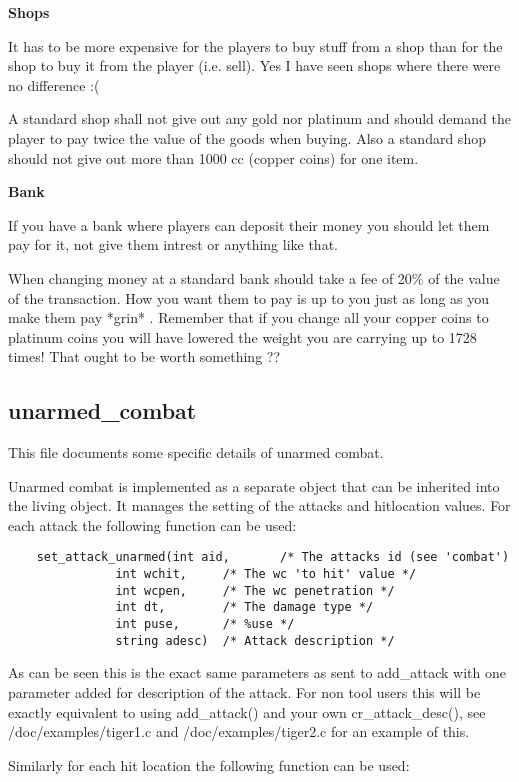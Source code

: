 {\bf Shops}

It has to be more expensive for the players to buy stuff from a
shop than for the shop to buy it from the player (i.e. sell). Yes
I have seen shops where there were no difference :( 

A standard shop shall not give out any gold nor platinum and
should demand the player to pay twice the value of the goods
when buying. Also a standard shop should not give out more than
1000 cc (copper coins) for one item.

{\bf Bank}

If you have a bank where players can deposit their money you should
let them pay for it, not give them intrest or anything like that.

When changing money at a standard bank should take a fee of
20\% of the value of the transaction. How you want them to pay is up
to you just as long as you make them pay *grin* .
Remember that if you change all your copper coins to platinum coins
you will have lowered the weight you are carrying up to 1728 times!
That ought to be worth something ??


\subsection{unarmed\_combat}

This file documents some specific details of unarmed combat.

Unarmed combat is implemented as a separate object that can be inherited
into the living object. It manages the setting of the attacks and hitlocation
values. For each attack the following function can be used:

\begin{verbatim}
    set_attack_unarmed(int aid,       /* The attacks id (see 'combat')
               int wchit,     /* The wc 'to hit' value */
               int wcpen,     /* The wc penetration */
               int dt,        /* The damage type */
               int puse,      /* %use */
               string adesc)  /* Attack description */
\end{verbatim}

As can be seen this is the exact same parameters as sent to add\_attack with
one parameter added for description of the attack. For non tool users this
will be exactly equivalent to using add\_attack() and your own cr\_attack\_desc(),
see /doc/examples/tiger1.c and /doc/examples/tiger2.c for an example of this.

Similarly for each hit location the following function can be used:


